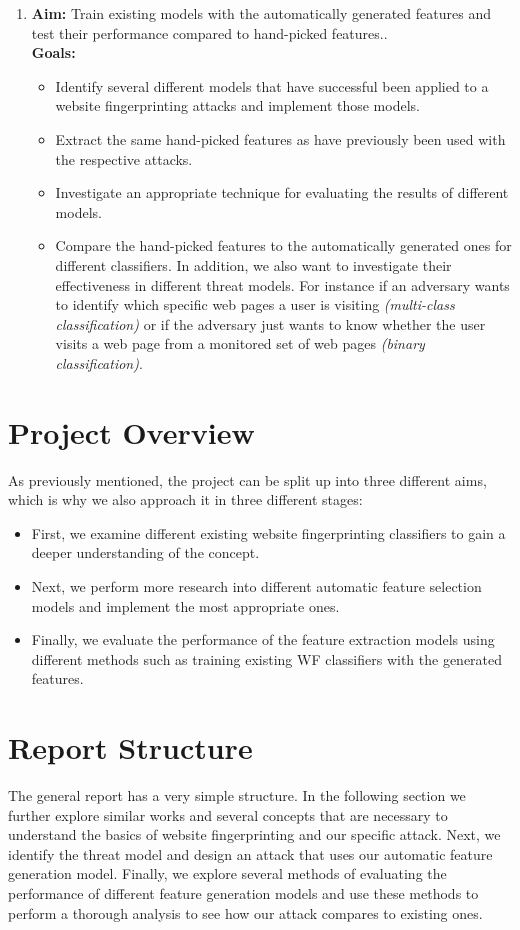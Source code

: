 \begin{enumerate}
   \item \textbf{Aim:} Train existing models with the automatically generated features and test their performance compared to hand-picked features..\\
   \textbf{Goals:}
   \begin{itemize}
      \item Identify several different models that have successful been applied to a website fingerprinting attacks and implement those models.
      \item Extract the same hand-picked features as have previously been used with the respective attacks.
      \item Investigate an appropriate technique for evaluating the results of different models.
      \item Compare the hand-picked features to the automatically generated ones for different classifiers. In addition, we also want to investigate
         their effectiveness in different threat models. For instance if an adversary wants to identify which specific web pages a user is visiting \textit{(multi-class classification)} or
         if the adversary just wants to know whether the user visits a web page from a monitored set of web pages \textit{(binary classification)}.
   \end{itemize}

\end{enumerate}

\newpage

\section{Project Overview}
As previously mentioned, the project can be split up into three different aims, which is why we also approach it in three different stages:

\begin{itemize}
\item First, we examine different existing website fingerprinting classifiers to gain a deeper understanding of the concept.
\item Next, we perform more research into different automatic feature selection models and implement the most appropriate ones.
\item Finally, we evaluate the performance of the feature extraction models using different methods such as training existing WF classifiers with the generated features.
\end{itemize}


\section{Report Structure}
The general report has a very simple structure.
In the following section we further explore similar works and several concepts that are necessary to understand the basics of website fingerprinting and our specific attack.
Next, we identify the threat model and design an attack that uses our automatic feature generation model.
Finally, we explore several methods of evaluating the performance of different feature generation models and use these methods to perform a thorough analysis to see how our attack compares to existing ones.
